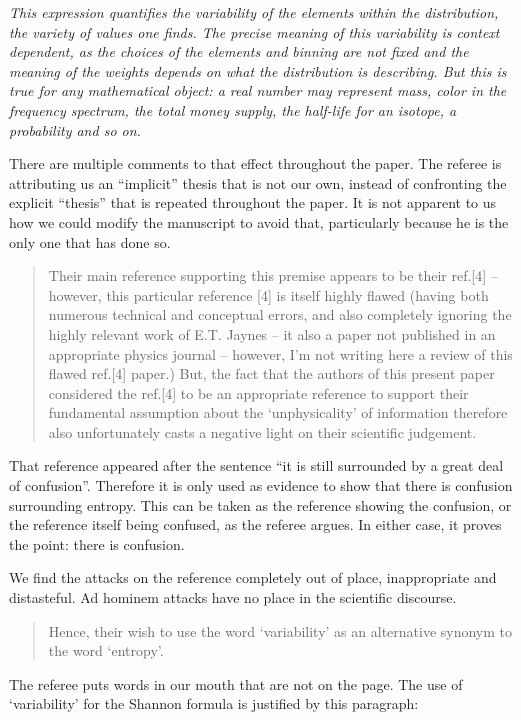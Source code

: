 \documentclass[11pt]{article}
\begin{document}
\emph{This expression quantifies the variability of the elements within the distribution, the variety of values one finds. The precise meaning of this variability is context dependent, as the choices of the elements and binning are not fixed and the meaning of the weights depends on what the distribution is describing. But this is true for any mathematical object: a real number may represent mass, color in the frequency spectrum, the total money supply, the half-life for an isotope, a probability and so on.}

There are multiple comments to that effect throughout the paper. The referee is attributing us an ``implicit'' thesis that is not our own, instead of confronting the explicit ``thesis'' that is repeated throughout the paper.  It is not apparent to us how we could modify the manuscript to avoid that, particularly because he is the only one that has done so.

\begin{quote}
 Their main reference supporting this premise appears to be their ref.[4] – however, this particular reference [4] is itself highly flawed (having both numerous technical and conceptual errors, and also completely ignoring the highly relevant work of E.T. Jaynes – it also a paper not published in an appropriate physics journal – however, I’m not writing here a review of this flawed ref.[4] paper.) But, the fact that the authors of this present paper considered the ref.[4] to be an appropriate reference to support their fundamental assumption about the ‘unphysicality’ of information therefore also unfortunately casts a negative light on their scientific judgement.
\end{quote}
That reference appeared after the sentence ``it is still surrounded by a great deal of confusion''. Therefore it is only used as evidence to show that there is confusion surrounding entropy. This can be taken as the reference showing the confusion, or the reference itself being confused, as the referee argues. In either case, it proves the point: there is confusion.

We find the attacks on the reference completely out of place, inappropriate and distasteful. Ad hominem attacks have no place in the scientific discourse.

\begin{quote}
Hence, their wish to use the word ‘variability’ as an alternative synonym to the word ‘entropy’.
\end{quote}

The referee puts words in our mouth that are not on the page. The use of `variability' for the Shannon formula is justified by this paragraph:
\end{document}

